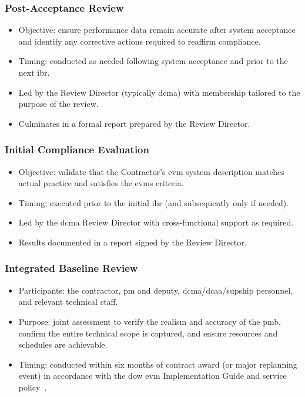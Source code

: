 \documentclass[../main.tex]{subfiles}
\begin{document}
\subsubsection{Post-Acceptance Review}
\begin{itemize}
  \item Objective: ensure performance data remain accurate after system acceptance and identify any corrective actions required to reaffirm compliance.
  \item Timing: conducted as needed following system acceptance and prior to the next \ac{ibr}.
  \item Led by the Review Director (typically \ac{dcma}) with membership tailored to the purpose of the review.
  \item Culminates in a formal report prepared by the Review Director.
\end{itemize}
\subsubsection{Initial Compliance Evaluation}
\begin{itemize}
  \item Objective: validate that the Contractor's \ac{evm} system description matches actual practice and satisfies the \ac{evms} criteria.
  \item Timing: executed prior to the initial \ac{ibr} (and subsequently only if needed).
  \item Led by the \ac{dcma} Review Director with cross-functional support as required.
  \item Results documented in a report signed by the Review Director.
\end{itemize}
\subsubsection{Integrated Baseline Review}
\begin{itemize}
  \item Participants: the contractor, \ac{pm} and deputy, \ac{dcma}/\ac{dcaa}/\ac{supship} personnel, and relevant technical staff.
  \item Purpose: joint assessment to verify the realism and accuracy of the \ac{pmb}, confirm the entire technical scope is captured, and ensure resources and schedules are achievable.
  \item Timing: conducted within six months of contract award (or major replanning event) in accordance with the \ac{dow} \ac{evm} Implementation Guide and service policy~\autocite{edo-3-6-1-evm-intro-2025}.
\end{itemize}
\end{document}
